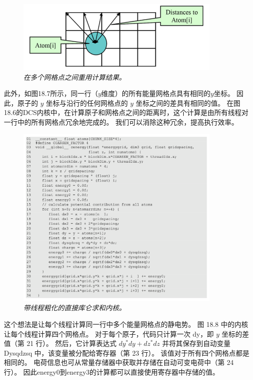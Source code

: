 \begin{figure}[H]
	\centering
	\includegraphics[width=0.9\textwidth]{figs/F18.7.png}
	\caption{\textit{在多个网格点之间重用计算结果。}}
\end{figure}

此外，如图18.7所示，同一行（$y$维度）的所有能量网格点具有相同的$y$坐标。 
因此，原子的 $y$ 坐标与沿行的任何网格点的 $y$ 坐标之间的差具有相同的值。 
在图18.6的DCS内核中，在计算原子和网格点之间的距离时，这个计算是由所有线程对一行中的所有网格点冗余地完成的。 
我们可以消除这种冗余，提高执行效率。

\begin{figure}[H]
	\centering
	\includegraphics[width=0.9\textwidth]{figs/F18.8.png}
	\caption{\textit{带线程粗化的直接库仑求和内核。}}
\end{figure}

这个想法是让每个线程计算同一行中多个能量网格点的静电势。 图 18.8 中的内核让每个线程计算四个网格点。 
对于每个原子，代码只计算一次 dy，即 $y$ 坐标的差值（第 21 行）。 
然后，它计算表达式 $d y^{*} d y+d z^{*} d z$ 并将其保存到自动变量 Dysqdzsq 中，该变量被分配给寄存器（第 23 行）。 
该值对于所有四个网格点都是相同的。 电荷信息也可从常量存储器中获取并存储在自动可变电荷中（第 24 行）。 
因此energy0到energy3的计算都可以直接使用寄存器中存储的值。


